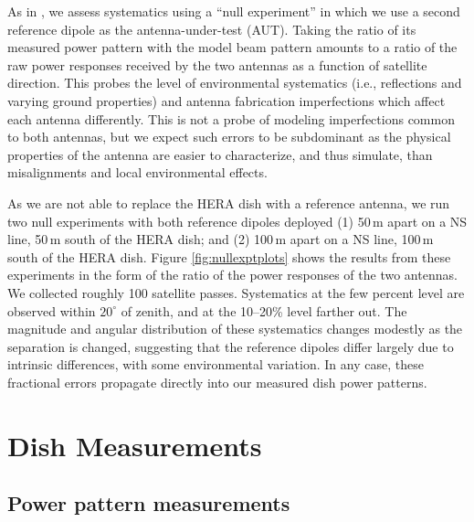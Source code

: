As in \citet{neben15}, we assess systematics using a ``null experiment'' in which we use a second reference dipole as the antenna-under-test (AUT). Taking the ratio of its measured power pattern with the model beam pattern amounts to a ratio of the raw power responses received by the two antennas as a function of satellite direction. This probes the level of environmental systematics (i.e., reflections and varying ground properties) and antenna fabrication imperfections which affect each antenna differently. This is not a probe of modeling imperfections common to both antennas, but we expect such errors to be subdominant as the physical properties of the antenna are easier to characterize, and thus simulate, than misalignments and local environmental effects. 

As we are not able to replace the HERA dish with a reference antenna, we run two null experiments with both reference dipoles deployed (1) 50\,m apart on a NS line, 50\,m south of the HERA dish; and (2) 100\,m apart on a NS line, 100\,m south of the HERA dish. Figure \ref{fig:nullexptplots} shows the results from these experiments in the form of the ratio of the power responses of the two antennas. We collected roughly 100 satellite passes. Systematics at the few percent level are observed within $20^\circ$ of zenith, and at the 10--20\% level farther out. The magnitude and angular distribution of these systematics changes modestly as the separation is changed, suggesting that the reference dipoles differ largely due to intrinsic differences, with some environmental variation. In any case, these fractional errors propagate directly into our measured dish power patterns.

\section{Dish Measurements}

\subsection{Power pattern measurements}
\label{sec:powerpatternmeasurements}

